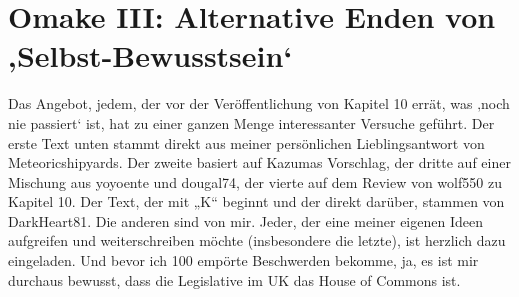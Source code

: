 









\section{Omake III: Alternative Enden von ‚Selbst-Bewusstsein‘}

Das Angebot, jedem, der vor der Veröffentlichung von Kapitel 10 errät, was ‚noch nie passiert‘ ist, hat zu einer ganzen Menge interessanter Versuche geführt. Der erste Text unten stammt direkt aus meiner persönlichen Lieblingsantwort von Meteoricshipyards. Der zweite basiert auf Kazumas Vorschlag, der dritte auf einer Mischung aus yoyoente und dougal74, der vierte auf dem Review von wolf550 zu Kapitel 10. Der Text, der mit
„K“ beginnt und der direkt darüber, stammen von DarkHeart81. Die anderen sind von mir. Jeder, der eine meiner eigenen Ideen aufgreifen und weiterschreiben möchte (insbesondere die letzte), ist herzlich dazu eingeladen. Und bevor ich 100 empörte Beschwerden bekomme, ja, es ist mir durchaus bewusst, dass die Legislative im UK das House of Commons ist.%


